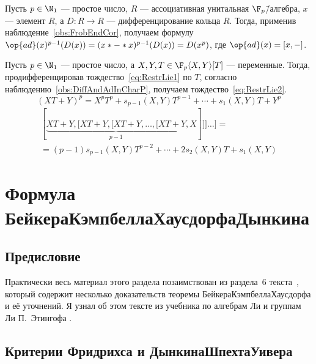 \documentclass[
	extrafontsizes,
	11pt,
	hyphens,
]{memoir}
\begin{document}
\begin{observation}
Пусть \(p \in \N_1\) --- простое число, \(R\) --- ассоциативная унитальная \(\F_p\)\=/алгебра, \(x\) --- элемент \(R\), а \(D : R \to R\) --- дифференцирование кольца \(R\).%
\label{obs:DiffAndAdInCharP}
Тогда, применив наблюдение~\ref{obs:FrobEndCor}, получаем формулу \(\op{ad}(x)^{p-1}(D(x)) = (x* - *x)^{p-1}(D(x)) = D(x^p)\), где \(\op{ad}(x) = [x, -]\).
\end{observation}

\begin{observation}
Пусть \(p \in \N_1\) --- простое число, а \(X, Y, T \in \F_p\langle X, Y \rangle [T]\) --- переменные.
Тогда, продифференцировав тождество~\eqref{eq:RestrLie1} по \(T\), согласно наблюдению~\ref{obs:DiffAndAdInCharP}, получаем тождество~\eqref{eq:RestrLie2}.
\begin{equation}
(XT + Y)^p = X^p T^p + s_{p-1}(X, Y) T^{p-1} + \cdots{} + s_1(X, Y) T + Y^p%
\label{eq:RestrLie1}%
\end{equation}
\begin{multline}
[\underbrace{XT + Y, [XT + Y, [XT + Y, \dots{}, [XT + Y}_{p-1}, X]]] \dots{} ] =%
\\
= (p - 1) s_{p - 1}(X, Y) T^{p - 2} + \cdots{} + 2 s_2(X, Y) T + s_1(X, Y)%
\label{eq:RestrLie2}
\end{multline}
\end{observation}


\section{Формула Бейкера\namedash{}Кэмпбелла\namedash{}Хаусдорфа\namedash{}Дынкина}
\label{sec:BKHD}

\subsection{Предисловие}

Практически весь материал этого раздела позаимствован из раздела~6 текста~\cite{Mueger_BCHD}, который содержит несколько доказательств теоремы Бейкера\namedash{}Кэмпбелла\namedash{}Хаусдорфа и её уточнений.
Я узнал об этом тексте из учебника по алгебрам Ли и группам Ли П.\ Этингофа \cite[\textenglish{Remark~14.8}]{EtingofLie_2024}.

\subsection{Критерии Фридрихса и Дынкина\namedash{}Шпехта\namedash{}Уивера}
\end{document}
